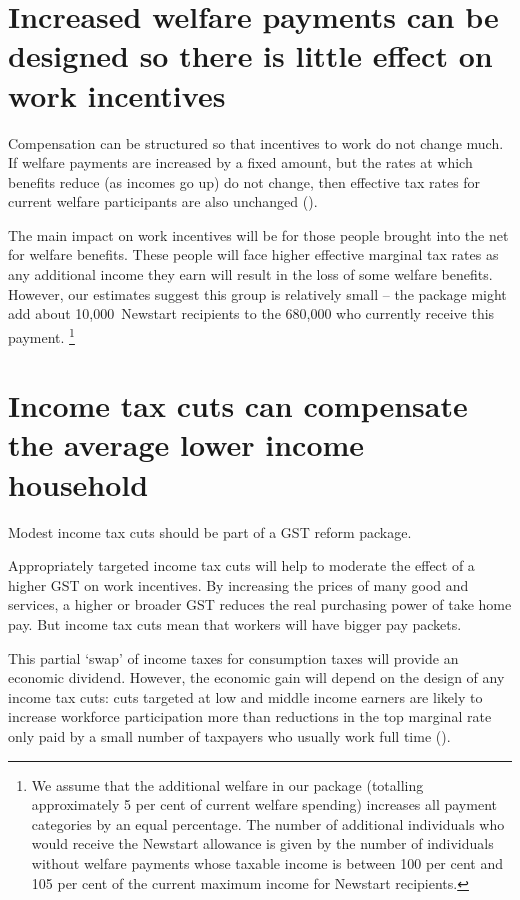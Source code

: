 \section{Increased welfare payments can be designed so there is little effect on work incentives\label{sec:GST-3-3}}
Compensation can be structured so that incentives to work do not change much. If welfare payments are increased by a fixed amount, but the rates at which benefits reduce (as incomes go up) do not change, then effective tax rates for current welfare participants are also unchanged ().

The main impact on work incentives will be for those people brought into the net for welfare benefits. These people will face higher effective marginal tax rates as any additional income they earn will result in the loss of some welfare benefits. However, our estimates suggest this group is relatively small – the package might add about 10,000~Newstart recipients to the 680,000 who currently receive this payment.%
\footnote{We assume that the additional welfare in our package (totalling approximately 5 per cent of current welfare spending) increases all payment categories by an equal percentage. The number of additional individuals who would receive the Newstart allowance is given by the number of individuals without welfare payments whose taxable income is between 100 per cent and 105 per cent of the current maximum income for Newstart recipients.}   

\section{Income tax cuts can compensate the average lower income household\label{sec:GST-3-4}}
Modest income tax cuts should be part of a GST reform package.

Appropriately targeted income tax cuts will help to moderate the effect of a higher GST on work incentives. By increasing the prices of many good and services, a higher or broader GST reduces the real purchasing power of take home pay. But income tax cuts mean that workers will have bigger pay packets. 

This partial ‘swap’ of income taxes for consumption taxes will provide an economic dividend. However, the economic gain will depend on the design of any income tax cuts: cuts targeted at low and middle income earners are likely to increase workforce participation more than reductions in the top marginal rate only paid by a small number of taxpayers who usually work full time (). 


